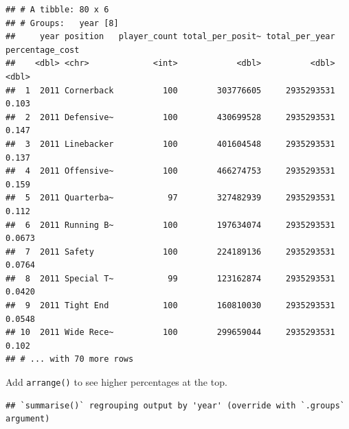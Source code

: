 \documentclass[
]{book}
\newenvironment{Shaded}{\begin{snugshade}}{\end{snugshade}}
\newcommand{\DataTypeTok}[1]{\textcolor[rgb]{0.13,0.29,0.53}{#1}}
\newcommand{\KeywordTok}[1]{\textcolor[rgb]{0.13,0.29,0.53}{\textbf{#1}}}
\newcommand{\NormalTok}[1]{#1}
\newcommand{\OperatorTok}[1]{\textcolor[rgb]{0.81,0.36,0.00}{\textbf{#1}}}
\newcommand{\StringTok}[1]{\textcolor[rgb]{0.31,0.60,0.02}{#1}}
\begin{document}
\begin{verbatim}
## # A tibble: 80 x 6
## # Groups:   year [8]
##     year position   player_count total_per_posit~ total_per_year percentage_cost
##    <dbl> <chr>             <int>            <dbl>          <dbl>           <dbl>
##  1  2011 Cornerback          100        303776605     2935293531          0.103 
##  2  2011 Defensive~          100        430699528     2935293531          0.147 
##  3  2011 Linebacker          100        401604548     2935293531          0.137 
##  4  2011 Offensive~          100        466274753     2935293531          0.159 
##  5  2011 Quarterba~           97        327482939     2935293531          0.112 
##  6  2011 Running B~          100        197634074     2935293531          0.0673
##  7  2011 Safety              100        224189136     2935293531          0.0764
##  8  2011 Special T~           99        123162874     2935293531          0.0420
##  9  2011 Tight End           100        160810030     2935293531          0.0548
## 10  2011 Wide Rece~          100        299659044     2935293531          0.102 
## # ... with 70 more rows
\end{verbatim}

Add \texttt{arrange()} to see higher percentages at the top.

\begin{Shaded}
\end{Shaded}

\begin{verbatim}
## `summarise()` regrouping output by 'year' (override with `.groups` argument)
\end{verbatim}
\end{document}
